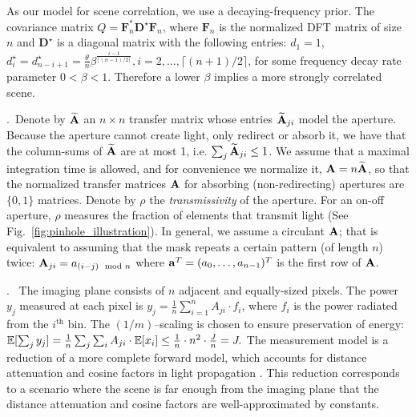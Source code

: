\documentclass{article}
\begin{document}
As our model for scene correlation, we use a decaying-frequency prior. The covariance matrix $Q = \mathbf{F}^*_n\mathbf{D}^\star\mathbf{F}_n$, where $\mathbf{F}_n$ is the normalized DFT matrix of size $n$ and $\mathbf{D}^\star$ is a diagonal matrix with the following entries: $d_1=1$, $d_i^\star = d_{n-i+1}^\star = \frac{\theta}{n}\beta^{\frac{i-1}{\lceil(n-1)/2\rceil}}, i=2,\ldots,\lceil(n+1)/2\rceil$, for some frequency decay rate parameter $0 < \beta < 1$. Therefore a lower $\beta$ implies a more strongly correlated scene.

.~Denote by $\widetilde{\mathbf{A}}$ an $n\times n$ transfer matrix whose entries $\widetilde{\mathbf{A}}_{ji}$ model the aperture. Because the aperture cannot create light, only redirect or absorb it, we have that the column-sums of $\widetilde{\mathbf{A}}$ are at most 1, i.e. $\sum_j \widetilde{\mathbf{A}}_{ji} \le 1$. We assume that a maximal integration time is allowed, and for convenience we normalize it, $\mathbf{A} = n\widetilde{\mathbf{A}}$, so that the normalized transfer matrices $\mathbf{A}$ for absorbing (non-redirecting) apertures are $\{0,1\}$ matrices. Denote by $\rho$ the \emph{transmissivity} of the aperture. For an on-off aperture, $\rho$ measures the fraction of elements that transmit light (See Fig.~\ref{fig:pinhole_illustration}). In general, we assume a circulant $\mathbf{A}$; that is equivalent to assuming that the mask repeats a certain pattern (of length $n$) twice: %
 $
 \mathbf{A}_{ji} = a_{(i-j)\mod{n}}
 $
 where $\mathbf{a}^T = (a_0,\ldots,a_{n-1})^T$ is the first row of $\mathbf{A}$.  

.~  The imaging plane consists of $n$ adjacent and equally-sized pixels.  The power $y_j$ measured at each pixel is $y_j=\frac{1}{n} \sum_{i=1}^n A_{ji}\cdot f_i$, where $f_i$ is the power radiated from the $i^\text{th}$ bin. %
The $(1/m)$--scaling is chosen to ensure preservation of energy:
$\mathbb{E}[\sum_j{y_j}] = \frac{1}{n}\sum_j\sum_i A_{ji} \cdot \mathbb{E}[x_i]  \leq \frac{1}{n}\cdot n^2 \cdot \frac{J}{n} = J.$
The measurement model is a reduction of a more complete forward model, which accounts for distance attenuation and cosine factors in light propagation \citep{brdf}.
This reduction corresponds to a scenario where the scene is far enough from the imaging plane that the distance attenuation and cosine factors are well-approximated by constants.
\end{document}
